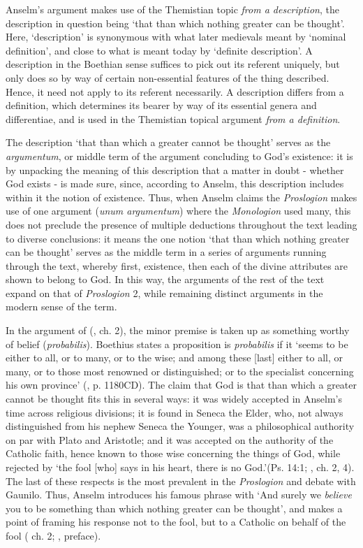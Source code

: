 \documentclass[]{birkjour}
\begin{document}
Anselm's argument makes use of the Themistian topic \textit{from a description}, the description in question being `that than which nothing greater can be thought'. Here, `description' is synonymous with what later medievals meant by `nominal definition', and close to what is meant today by `definite description'. A description in the Boethian sense suffices to pick out its referent uniquely, but only does so by way of certain non-essential features of the thing described. Hence, it need not apply to its referent necessarily. A description differs from a definition, which determines its bearer by way of its essential genera and differentiae, and is used in the Themistian topical argument \textit{from a definition}. 

The description `that than which a greater cannot be thought' serves as the \textit{argumentum}, or middle term of the argument concluding to God's existence: it is by unpacking the meaning of this description that a matter in doubt - whether God exists - is made sure, since, according to Anselm, this description includes within it the notion of existence. Thus, when Anselm claims the \textit{Proslogion} makes use of one argument (\textit{unum argumentum}) where the \textit{Monologion} used many, this does not preclude the presence of multiple deductions throughout the text leading to diverse conclusions: it means the one notion `that than which nothing greater can be thought' serves as the middle term in a series of arguments running through the text, whereby first, existence, then each of the divine attributes are shown to belong to God. In this way, the arguments of the rest of the text expand on that of \textit{Proslogion} 2, while remaining distinct arguments in the modern sense of the term.

In the argument of (\cite{AnselmPros}, ch. 2), the minor premise is taken up as something worthy of belief (\textit{probabilis}). Boethius states a proposition is \textit{probabilis} if it `seems to be either to all, or to many, or to the wise; and among these [last] either to all, or many, or to those most renowned or distinguished; or to the specialist concerning his own province' (\cite{BDT}, p. 1180CD). The claim that God is that than which a greater cannot be thought fits this in several ways: it was widely accepted in Anselm's time across religious divisions; it is found in Seneca the Elder, who, not always distinguished from his nephew Seneca the Younger, was a philosophical authority on par with Plato and Aristotle; and it was accepted on the authority of the Catholic faith, hence known to those wise concerning the things of God, while rejected by `the fool [who] says in his heart, there is no God.'(Ps. 14:1; \cite{AnselmPros}, ch. 2, 4). The last of these respects is the most prevalent in the \textit{Proslogion} and debate with Gaunilo. Thus, Anselm introduces his famous phrase with `And surely we \textit{believe} you to be something than which nothing greater can be thought', and makes a point of framing his response not to the fool, but to a Catholic on behalf of the fool (\cite{AnselmPros} ch. 2; \cite{AnselmResp}, preface). 
\end{document}
